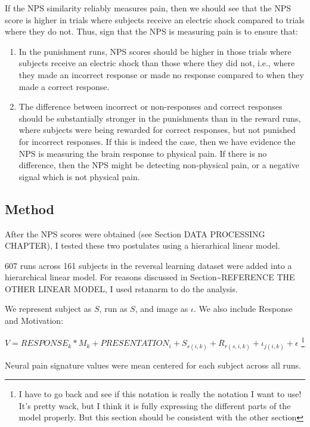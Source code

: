 \documentclass[]{article}
\providecommand{\tightlist}{%
  \setlength{\itemsep}{0pt}\setlength{\parskip}{0pt}}
\let\rmarkdownfootnote\footnote%
\def\footnote{\protect\rmarkdownfootnote}
\begin{document}
If the NPS similarity reliably measures pain, then we should see that
the NPS score is higher in trials where subjects receive an electric
shock compared to trials where they do not. Thus, sign that the NPS is
measuring pain is to ensure that:

\begin{enumerate}
\def\labelenumi{\arabic{enumi}.}
\tightlist
\item
  In the punishment runs, NPS scores should be higher in those trials
  where subjects receive an electric shock than those where they did
  not, i.e., where they made an incorrect response or made no response
  compared to when they made a correct response.
\item
  The difference between incorrect or non-responses and correct
  responses should be substantially stronger in the punishments than in
  the reward runs, where subjects were being rewarded for correct
  responses, but not punished for incorrect responses. If this is indeed
  the case, then we have evidence the NPS is measuring the brain
  response to physical pain. If there is no difference, then the NPS
  might be detecting non-physical pain, or a negative signal which is
  not physical pain.
\end{enumerate}

\subsection{Method}\label{method}

After the NPS scores were obtained (see Section DATA PROCESSING
CHAPTER), I tested these two postulates using a hierarhical linear
model.

607 runs across 161 subjects in the reversal learning dataset were added
into a hierarchical linear model. For reasons discussed in
Section\textasciitilde{}REFERENCE THE OTHER LINEAR MODEL, I used
rstanarm to do the analysis.

We represent subject as \(S\), run as \(S\), and image as \(\iota\). We
also include Response and Motivation:

\(V=\mathit{RESPONSE}_k*M_k+\mathit{PRESENTATION}_{i} + S_{s(i, k )} + R_{r(s,i , k )} + \iota_{j(i, k)} + \epsilon\)
\footnote{I have to go back and see if this notation is really the notation I want to use! It's pretty wack, but I think it is fully expressing the different parts of the model properly. But this section should be consistent with the other section}

Neural pain signature values were mean centered for each subject across
all runs.
\end{document}
